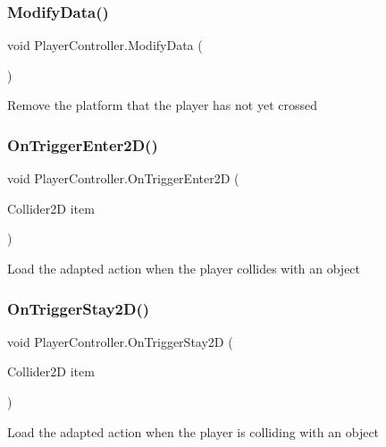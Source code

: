 \subsubsection{\texorpdfstring{Modify\+Data()}{ModifyData()}}
{\footnotesize\ttfamily void Player\+Controller.\+Modify\+Data (\begin{DoxyParamCaption}{ }\end{DoxyParamCaption})}

Remove the platform that the player has not yet crossed \mbox{\label{class_player_controller_a5089c3b70c67e44c1baa684edf2e49b1}} 
\subsubsection{\texorpdfstring{On\+Trigger\+Enter2\+D()}{OnTriggerEnter2D()}}
{\footnotesize\ttfamily void Player\+Controller.\+On\+Trigger\+Enter2D (\begin{DoxyParamCaption}\item[{Collider2D}]{item }\end{DoxyParamCaption})\hspace{0.3cm}{\ttfamily [private]}}

Load the adapted action when the player collides with an object \mbox{\label{class_player_controller_a94228bb8a3427c315206d97aa606fe07}} 
\subsubsection{\texorpdfstring{On\+Trigger\+Stay2\+D()}{OnTriggerStay2D()}}
{\footnotesize\ttfamily void Player\+Controller.\+On\+Trigger\+Stay2D (\begin{DoxyParamCaption}\item[{Collider2D}]{item }\end{DoxyParamCaption})\hspace{0.3cm}{\ttfamily [private]}}

Load the adapted action when the player is colliding with an object \mbox{\label{class_player_controller_a2037a2ff31a22db7022be1ad13c61a9d}} 
